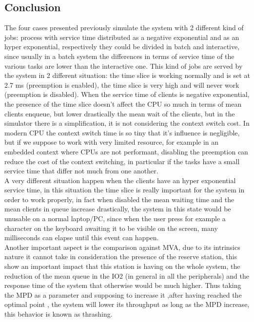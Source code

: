 \documentclass[12pt,a4paper]{article}
\begin{document}
\subsection{Conclusion}



The four cases presented previously simulate the system with 2 different kind of jobs: process with service time distributed as a negative exponential and as an hyper exponential, respectively they could be divided in batch and interactive, since usually in a batch system the differences in terms of service time of the various tasks are lower than the interactive one. This kind of jobs are served by the system in 2 different situation: the time slice is working normally and is set at 2.7 ms (preemption is enabled), the time slice is very high and will never work (preemption is disabled). When the service time of clients is negative exponential, the presence of the time slice doesn't affect the CPU so much in terms of mean clients enqueue, but lower drastically the mean wait of the clients, but in the simulator there is a simplification, it is not considering the context switch cost. In modern CPU the context switch time is so tiny that it's influence is negligible, but if we suppose to work with very limited resource, for example in an embedded context where CPUs are not performant, disabling the preemption can reduce the cost of the context switching, in particular if the tasks have a small service time that differ not much from one another.\\
A very different situation happen when the clients have an hyper exponential service time, in this situation the time slice is really important for the system in order to work properly, in fact when disabled the mean waiting time and the mean clients in queue increase drastically, the system in this state would be unusable on a normal laptop/PC, since when the user press for example a character on the keyboard awaiting it to be visible on the screen, many milliseconds can elapse until this event can happen.\\
Another important aspect is the comparison against MVA, due to its intrinsics nature it cannot take in consideration the presence of the reserve station, this show an important impact that this station is having on the whole system, the reduction of the mean queue in the IO2 (in general in all the peripherals) and the response time of the system that otherwise would be much higher. Thus taking the MPD as a parameter and supposing to increase it ,after having reached the optimal point , the system will lower its throughput as long as the MPD increase, this behavior is known as thrashing.
\end{document}
